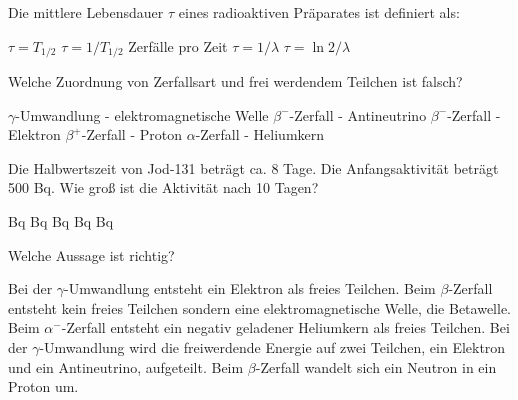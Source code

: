 \documentclass[11pt]{exam}
\begin{document}
\setlength{\voffset}{-0.5in}
\setlength{\headsep}{5pt}

\hspace{2mm}
 \hspace{5mm}
\vspace{4mm}

\begin{questions}

\question Die mittlere Lebensdauer \( \tau \) eines radioaktiven Präparates ist definiert als:

\begin{choices}
	\choice \( \tau = T_{1/2} \)
	\choice \( \tau = 1/T_{1/2} \)
	\choice Zerfälle pro Zeit
	\choice \( \tau = 1/\lambda \)
	\choice \( \tau = \ln 2 / \lambda \)
\end{choices}

\vspace{3mm}\question Welche Zuordnung von Zerfallsart und frei werdendem Teilchen ist falsch?

\begin{choices}
	\choice \( \gamma \)-Umwandlung - elektromagnetische Welle
	\choice \( \beta^- \)-Zerfall - Antineutrino
	\choice \( \beta^- \)-Zerfall - Elektron
	\choice \( \beta^+ \)-Zerfall - Proton
	\choice \( \alpha \)-Zerfall - Heliumkern
\end{choices}

\vspace{3mm}\question Die Halbwertszeit von Jod-131 beträgt ca. 8 Tage. Die Anfangsaktivität beträgt 500 Bq. Wie groß ist die Aktivität nach 10 Tagen?

\begin{choices}
	 Bq
	 Bq
	 Bq
	 Bq
	 Bq
\end{choices}

\vspace{3mm}\question Welche Aussage ist richtig?

\begin{choices}
	\choice Bei der \( \gamma \)-Umwandlung entsteht ein Elektron als freies Teilchen.
	\choice Beim \( \beta \)-Zerfall entsteht kein freies Teilchen sondern eine elektromagnetische Welle, die Betawelle.
	\choice Beim \( \alpha^- \)-Zerfall entsteht ein negativ geladener Heliumkern als freies Teilchen.
	\choice Bei der \( \gamma \)-Umwandlung wird die freiwerdende Energie auf zwei Teilchen, ein Elektron und ein Antineutrino, aufgeteilt.
	\choice Beim \( \beta \)-Zerfall wandelt sich ein Neutron in ein Proton um.
\end{choices}


\end{questions}
\end{document}
